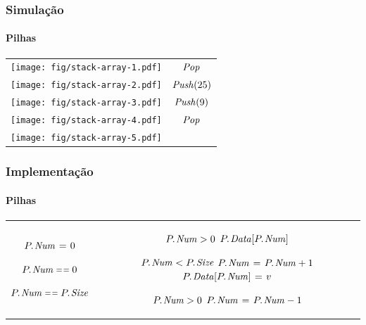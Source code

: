 \documentclass{beamer}
\begin{document}
\begin{frame}
  \frametitle{Simulação}
  \framesubtitle{Pilhas}

  \begin{center}
    \begin{tabular}{cc}
      \texttt{[image: fig/stack-array-1.pdf]}
      \pause
      &
      $\id{Pop}$ \pause
      \\
      \texttt{[image: fig/stack-array-2.pdf]}
      \pause
      &
      $\id{Push}(25)$ \pause
      \\
      \texttt{[image: fig/stack-array-3.pdf]}
      \pause
      &
      $\id{Push}(9)$ \pause
      \\
      \texttt{[image: fig/stack-array-4.pdf]}
      &
      $\id{Pop}$ \pause
      \\
      \texttt{[image: fig/stack-array-5.pdf]}
      &
    \end{tabular}
  \end{center}

\end{frame}

\begin{frame}

  \frametitle{Implementação}
  \framesubtitle{Pilhas}

\begin{tabular}{cc}
\begin{minipage}{.42\textwidth}
\begin{codebox}
\Procname{$\proc{Init}(P)$}
\li $\attrib{P}{Num} \gets 0$
\end{codebox}
\pause
\begin{codebox}
\Procname{$\proc{Empty}(P)$}
\li  \Return $\attrib{P}{Num} \isequal 0$
\end{codebox}
\pause
\begin{codebox}
\Procname{$\proc{Full}(P)$}
\li  \Return $\attrib{P}{Num} \isequal \attrib{P}{Size}$
\end{codebox}
\pause
\end{minipage}
&
\begin{minipage}{.55\textwidth}
\begin{codebox}
\Procname{$\proc{Top}(P)$}
\li  \If $\attrib{P}{Num} > 0$
\li    \Then \Return $\attrib{P}{Data}[\attrib{P}{Num}]$
     \End
\end{codebox}
\pause
\begin{codebox}
\Procname{$\proc{Push}(P, v)$}
\li  \If $\attrib{P}{Num} < \attrib{P}{Size}$
\li    \Then $\attrib{P}{Num} \gets \attrib{P}{Num} + 1$
\li      $\attrib{P}{Data}[\attrib{P}{Num}] \gets v$
     \End
\end{codebox}
\pause
\begin{codebox}
\Procname{$\proc{Pop}(P)$}
\li  \If $\attrib{P}{Num} > 0$
\li    \Then $\attrib{P}{Num} \gets \attrib{P}{Num} - 1$
     \End
\end{codebox}
\end{minipage}
\end{tabular}
\end{frame}
\end{document}
